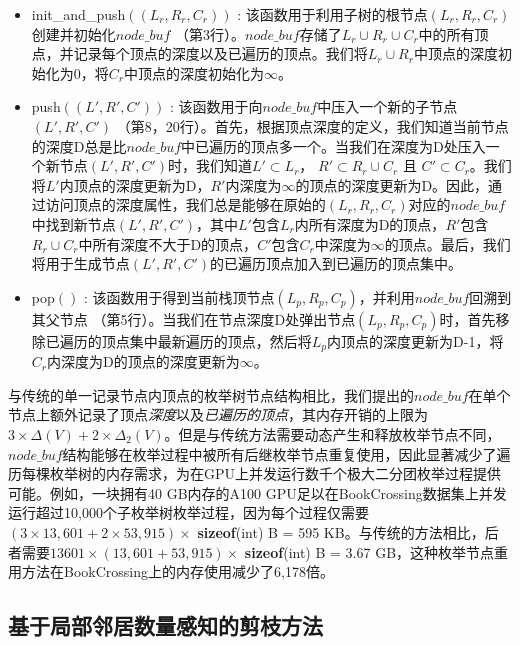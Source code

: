 \begin{itemize}
  \item  \textsf{init\_and\_push}$((L_r,R_r,C_r))$ : 该函数用于利用子树的根节点$(L_r,R_r,C_r)$创建并初始化$node\_buf$ （第3行）。$node\_buf$存储了$L_r \cup R_r \cup C_r$中的所有顶点，并记录每个顶点的深度以及已遍历的顶点。我们将$L_r \cup R_r$中顶点的深度初始化为0，将$C_r$中顶点的深度初始化为$\infty$。
  
  \item  \textsf{push}$((L',R',C'))$ : 该函数用于向$node\_buf$中压入一个新的子节点$(L',R',C')$ （第8，20行）。首先，根据顶点深度的定义，我们知道当前节点的深度D总是比$node\_buf$中已遍历的顶点多一个。当我们在深度为D处压入一个新节点$(L',R',C')$时，我们知道$L' \subset L_r$， $R' \subset R_r \cup C_r$ 且 $C' \subset C_r$。我们将$L'$内顶点的深度更新为D，$R'$内深度为$\infty$的顶点的深度更新为D。因此，通过访问顶点的深度属性，我们总是能够在原始的$(L_r,R_r,C_r)$对应的$node\_buf$中找到新节点$(L',R',C')$，其中$L'$包含$L_r$内所有深度为D的顶点，$R'$包含$R_r\cup C_r$中所有深度不大于D的顶点，$C'$包含$C_r$中深度为$\infty$的顶点。最后，我们将用于生成节点$(L',R',C')$的已遍历顶点加入到已遍历的顶点集中。

  \item  \textsf{pop}$()$ : 该函数用于得到当前栈顶节点$(L_p,R_p,C_p)$，并利用$node\_buf$回溯到其父节点 （第5行）。当我们在节点深度D处弹出节点$(L_p,R_p,C_p)$时，首先移除已遍历的顶点集中最新遍历的顶点，然后将$L_p$内顶点的深度更新为D-1，将$C_r$内深度为D的顶点的深度更新为$\infty$。
  
\end{itemize}




与传统的单一记录节点内顶点的枚举树节点结构相比，我们提出的$node\_buf$在单个节点上额外记录了顶点\textit{深度}以及\textit{已遍历的顶点}，其内存开销的上限为$3 \times \Delta(V) + 2 \times \Delta_2(V)$。但是与传统方法需要动态产生和释放枚举节点不同，$node\_buf$结构能够在枚举过程中被所有后继枚举节点重复使用，因此显著减少了遍历每棵枚举树的内存需求，为在GPU上并发运行数千个极大二分团枚举过程提供可能。例如，一块拥有40 GB内存的A100 GPU足以在BookCrossing数据集上并发运行超过10,000个子枚举树枚举过程，因为每个过程仅需要$(3 \times 13,601 + 2 \times 53,915) \times$ \textbf{sizeof}(int) B = 595 KB。与传统的方法相比，后者需要$13601 \times (13,601 + 53,915)\times$ \textbf{sizeof}(int) B = 3.67 GB，这种枚举节点重用方法在BookCrossing上的内存使用减少了6,178倍。

\subsection{基于局部邻居数量感知的剪枝方法}
\label{subsec:gmbe_prune}

